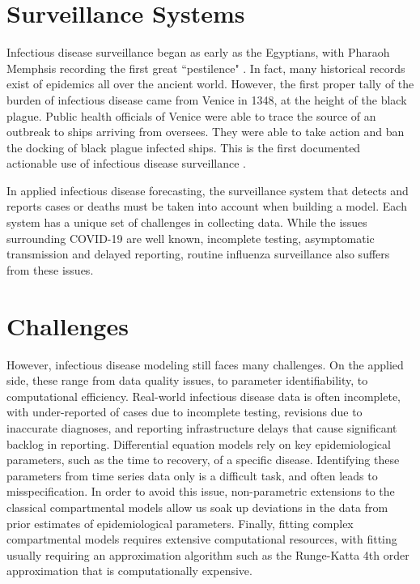 \documentclass{umassthesis}          %
\begin{document}
\section{Surveillance Systems}

Infectious disease surveillance began as early as the Egyptians, with Pharaoh Memphsis recording the first great ``pestilence" \cite{choi2012past}. In fact, many historical records exist of epidemics all over the ancient world. However, the first proper tally of the burden of infectious disease came from Venice in 1348, at the height of the black plague. Public health officials of Venice were able to trace the source of an outbreak to ships arriving from oversees. They were able to take action and ban the docking of black plague infected ships. This is the first documented actionable use of infectious disease surveillance \cite{moro1988surveillance}. 

In applied infectious disease forecasting, the surveillance system that detects and reports cases or deaths must be taken into account when building a model. Each system has a unique set of challenges in collecting data. While the issues surrounding COVID-19 are well known, incomplete testing, asymptomatic transmission and delayed reporting, routine influenza surveillance also suffers from these issues. 

\section{Challenges}
   However, infectious disease modeling still faces many challenges. On the applied side, these range from data quality issues, to parameter identifiability, to computational efficiency. Real-world infectious disease data is often incomplete, with under-reported of cases due to incomplete testing, revisions due to inaccurate diagnoses, and reporting infrastructure delays that cause significant backlog in reporting.  Differential equation models rely on key epidemiological parameters, such as the time to recovery, of a specific disease. Identifying these parameters from time series data only is a difficult task, and often leads to misspecification. In order to avoid this issue, non-parametric extensions to the classical compartmental models allow us soak up deviations in the data from prior estimates of epidemiological parameters. Finally, fitting complex compartmental models requires extensive computational resources, with fitting usually requiring an approximation algorithm such as the Runge-Katta 4th order approximation that is computationally expensive. 
   
\end{document}
